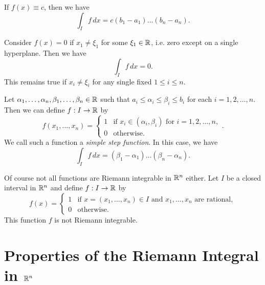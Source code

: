 \begin{example}
  If $f(x) \equiv c$, then we have
  \[
    \int_I f\, dx = c (b_1 - a_1) \dots (b_n - a_n).
  \]
\end{example}

\begin{example}
  Consider $f(x) = 0$ if $x_1 \ne \xi_1$ for some $\xi_1 \in \mathbb{R}$, i.e. zero except on a single hyperplane.
  Then we have
  \[
    \int_I f\, dx = 0.
  \]
  This remains true if $x_i \ne \xi_i$ for any single
  fixed $1 \le i \le n$.
\end{example}

\begin{example}
  Let $\alpha_1, \dots, \alpha_n, \beta_1, \dots, \beta_n \in \mathbb{R}$
  such that $a_i \le \alpha_i \le \beta_i \le b_i$
  for each $i = 1, 2, \dots, n$. Then we can define
  $f : I \to \mathbb{R}$ by
  \[
  f(x_1, \dots, x_n) =
  \begin{cases}
    1 & \text{if } x_i \in (\alpha_i, \beta_i) \text{ for } i = 1, 2, \dots, n, \\
    0 & \text{otherwise}.
  \end{cases}
  .\]
  We call such a function a \emph{simple step function}.
  In this case, we have
  \[
    \int_I f\, dx = (\beta_1 - \alpha_1) \dots (\beta_n - \alpha_n).
  \]
\end{example}

\begin{example}
  Of course not all functions are Riemann integrable
  in $\mathbb{R}^n$ either. Let $I$ be a closed interval in
  $\mathbb{R}^n$ and define $f : I \to \mathbb{R}$ by
  \[
    f(x) =
    \begin{cases}
      1 & \text{if } x = (x_1, \dots, x_n) \in I \text{ and } x_1, \dots, x_n \text{ are rational}, \\
      0 & \text{otherwise}.
    \end{cases}
  \]
  This function $f$ is not Riemann integrable.
\end{example}

\section{Properties of the Riemann Integral in \texorpdfstring{$\mathbb{R}^n$}{Rn}}

